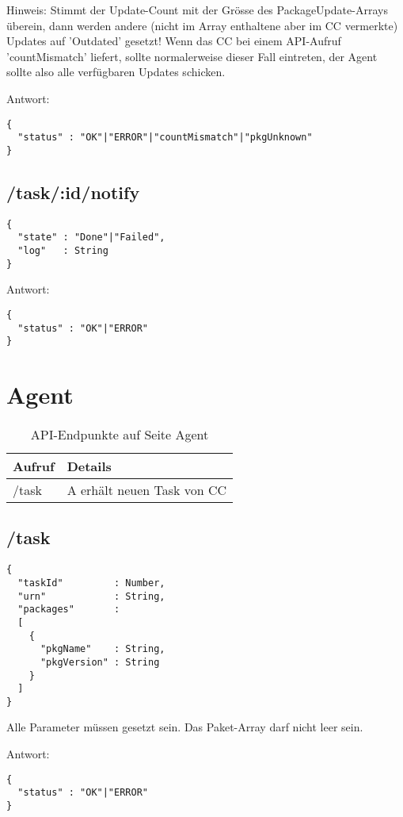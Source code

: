 Hinweis: Stimmt der Update-Count mit der Grösse des PackageUpdate-Arrays überein, dann werden andere (nicht im Array enthaltene aber im CC vermerkte) Updates auf 'Outdated' gesetzt! Wenn das CC bei einem API-Aufruf 'countMismatch' liefert, sollte normalerweise dieser Fall eintreten, der Agent sollte also alle verfügbaren Updates schicken.


Antwort:

\begin{verbatim}
{
  "status" : "OK"|"ERROR"|"countMismatch"|"pkgUnknown"
}
\end{verbatim}

\subsection*{/task/:id/notify}

\begin{verbatim}
{
  "state" : "Done"|"Failed",
  "log"   : String
}
\end{verbatim}


Antwort: 

\begin{verbatim}
{
  "status" : "OK"|"ERROR" 
}
\end{verbatim}

\section*{Agent}

\begin{table}[H]
    \centering
    \caption{API-Endpunkte auf Seite Agent}
    \label{api:endpoints_a}
    \begin{tabular}{ll}
        \hline
        \textbf{Aufruf}  & \textbf{Details}            \\ \hline
        /task            & A erhält neuen Task von CC  \\ \hline
    \end{tabular}
\end{table}

\subsection*{/task}

\begin{verbatim}
{
  "taskId"         : Number,
  "urn"            : String,
  "packages"       : 
  [
    {
      "pkgName"    : String,
      "pkgVersion" : String
    }
  ]
}
\end{verbatim}

Alle Parameter müssen gesetzt sein. Das Paket-Array darf nicht leer sein.


Antwort:

\begin{verbatim}
{
  "status" : "OK"|"ERROR" 
}
\end{verbatim}